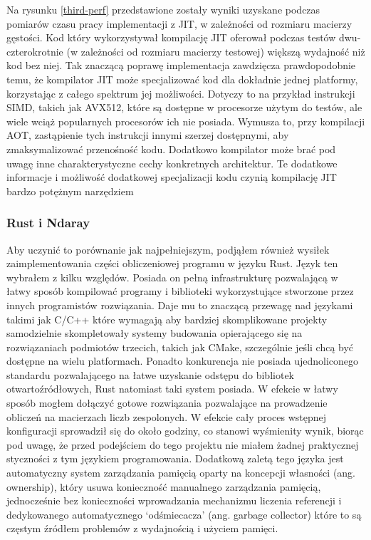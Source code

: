 \documentclass[11pt, a4paper]{article}
\begin{document}
\begin{sloppypar}
    Na rysunku \ref{third-perf} przedstawione zostały wyniki uzyskane podczas pomiarów czasu
    pracy implementacji z JIT, w zależności od rozmiaru macierzy gęstości. Kod który wykorzystywał
    kompilację JIT oferował podczas testów dwu-czterokrotnie (w zależności od rozmiaru
    macierzy testowej) większą wydajność niż kod bez niej. Tak znaczącą poprawę
    implementacja zawdzięcza prawdopodobnie temu, że kompilator JIT może specjalizować kod
    dla dokładnie jednej platformy, korzystając z całego spektrum jej możliwości. Dotyczy
    to na przykład instrukcji SIMD, takich jak AVX512, które są dostępne w procesorze użytym
    do testów, ale wiele wciąż popularnych procesorów ich nie posiada. Wymusza to, przy
    kompilacji AOT, zastąpienie tych instrukcji innymi szerzej dostępnymi, aby
    zmaksymalizować przenośność kodu. Dodatkowo kompilator może brać pod uwagę inne charakterystyczne
    cechy konkretnych architektur. Te dodatkowe informacje i możliwość dodatkowej
    specjalizacji kodu czynią kompilację JIT bardzo potężnym narzędziem

    \subsubsection{ Rust i Ndaray}


    Aby uczynić to porównanie jak najpełniejszym, podjąłem również wysiłek
    zaimplementowania części obliczeniowej programu w języku Rust. Język ten wybrałem z kilku
    względów. Posiada on pełną infrastrukturę pozwalającą w łatwy sposób kompilować
    programy i biblioteki wykorzystujące stworzone przez innych programistów rozwiązania.
    Daje mu to znaczącą przewagę nad językami takimi jak C/C++ które wymagają aby bardziej
    skomplikowane projekty samodzielnie skompletowały systemy budowania opierającego się
    na rozwiązaniach podmiotów trzecich, takich jak CMake, szczególnie jeśli chcą być dostępne
    na wielu platformach. Ponadto konkurencja nie posiada ujednoliconego standardu
    pozwalającego na łatwe uzyskanie odstępu do bibliotek otwartoźródłowych, Rust natomiast
    taki system posiada. W efekcie w łatwy sposób mogłem dołączyć gotowe rozwiązania
    pozwalające na prowadzenie obliczeń na macierzach liczb zespolonych. W efekcie cały proces
    wstępnej konfiguracji sprowadził się do około godziny, co stanowi wyśmienity wynik, biorąc
    pod uwagę, że przed podejściem do tego projektu nie miałem żadnej praktycznej
    styczności z tym językiem programowania. Dodatkową zaletą tego języka jest automatyczny
    system zarządzania pamięcią oparty na koncepcji własności (ang. ownership), który usuwa
    konieczność manualnego zarządzania pamięcią, jednocześnie bez konieczności
    wprowadzania mechanizmu liczenia referencji i dedykowanego automatycznego `odśmiecacza'
    (ang. garbage collector) które to są częstym źródłem problemów z wydajnością i użyciem
    pamięci.


\end{sloppypar}
\end{document}
